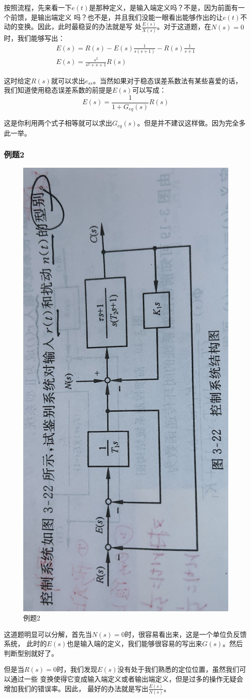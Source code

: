 \documentclass{ctexart}
\begin{document}
按照流程，先来看一下$e(t)$是那种定义，是输入端定义吗？不是，因为前面有一个前馈，是输出端定义
吗？也不是，并且我们没能一眼看出能够作出的让$e(t)$不动的变换。因此，此时最稳妥的办法就是写
处$\frac{E(s)}{X(s)}$。对于这道题，在$N(s)=0$时，我们能够写出：
\begin{gather}
    E(s) = R(s) - E(s)\frac{1}{s(s+1)} - R(s)\frac{1}{s+1} \\
    E(s) = \frac{s^2}{s^2 + s + 1}R(s)
\end{gather}

这时给定$R(s)$就可以求出$e_{ss}$。当然如果对于稳态误差系数法有某些喜爱的话，
我们知道使用稳态误差系数的前提是$E(s)$可以写成：
\begin{equation}
    E(s) = \frac{1}{1 + G_{eq}(s)} R(s)
\end{equation}

这是你利用两个式子相等就可以求出$G_{eq}(s)$。但是并不建议这样做。因为完全多此一举。

\subsubsection*{例题2}
\begin{figure}[H]
    \centering
    \includegraphics[height=0.9\textwidth, angle=90]{./pics/steady_state_error/example2.jpg}
    \caption{例题2}
    \label{Fig.5}
\end{figure}

这道题明显可以分解，首先当$N(s)=0$时，很容易看出来，这是一个单位负反馈系统，
此时的$E(s)$也是输入端的定义，我们能够很容易的写出来$G(s)$。然后判断型别就好了。

但是当$R(s)=0$时，我们发现$E(s)$没有处于我们熟悉的定位位置，虽然我们可以通过一些
变换使得它变成输入端定义或者输出端定义，但是过多的操作无疑会增加我们的错误率。因此，
最好的办法就是写出$\frac{E(s)}{N(s)}$。
\end{document}
